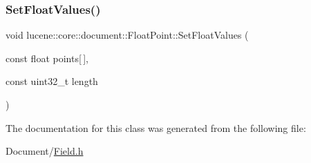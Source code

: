 \subsubsection{\texorpdfstring{Set\+Float\+Values()}{SetFloatValues()}}
{\footnotesize\ttfamily void lucene\+::core\+::document\+::\+Float\+Point\+::\+Set\+Float\+Values (\begin{DoxyParamCaption}\item[{const float}]{points\mbox{[}$\,$\mbox{]},  }\item[{const uint32\+\_\+t}]{length }\end{DoxyParamCaption})\hspace{0.3cm}{\ttfamily [inline]}}



The documentation for this class was generated from the following file\+:\begin{DoxyCompactItemize}
\item 
Document/\mbox{\hyperlink{Document_2Field_8h}{Field.\+h}}\end{DoxyCompactItemize}
